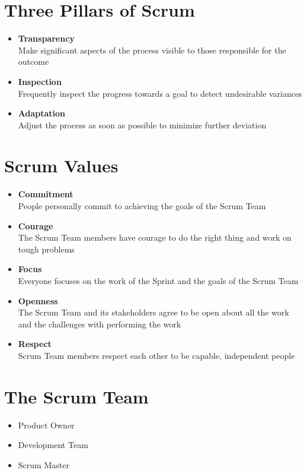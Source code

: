 \documentclass[a4paper,11pt,twocolumn]{article}
\begin{document}
\section*{Three Pillars of Scrum}
\begin{itemize}
	\item \textbf{Transparency}\\
	Make significant aspects of the process visible to those responsible for the outcome
	\item \textbf{Inspection}\\
	Frequently inspect the progress towards a goal to detect undesirable variances
	\item \textbf{Adaptation}\\
	Adjust the process as soon as possible to minimize further deviation
\end{itemize}

\section*{Scrum Values}
\begin{itemize}
    \item \textbf{Commitment}\\
    People personally commit to achieving the goals of the Scrum Team
    \item \textbf{Courage}\\
    The Scrum Team members have courage to do the right thing and work on tough problems
    \item \textbf{Focus}\\
    Everyone focuses on the work of the Sprint and the goals of the Scrum Team
    \item \textbf{Openness}\\
    The Scrum Team and its stakeholders agree to be open about all the work and the challenges with performing the work
    \item \textbf{Respect}\\
    Scrum Team members respect each other to be capable, independent people
\end{itemize}

\section*{The Scrum Team}
\begin{itemize}
    \item Product Owner
    \item Development Team
    \item Scrum Master
\end{itemize}
\end{document}
